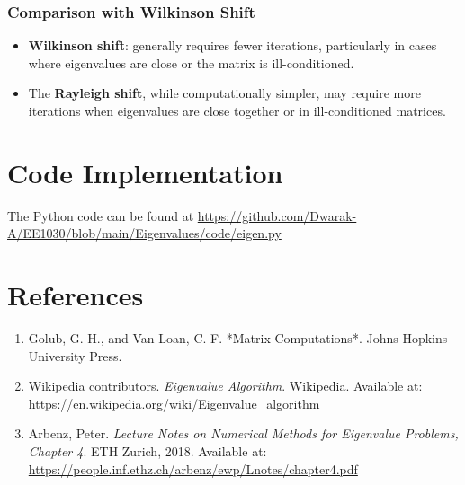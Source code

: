 \documentclass[12pt]{article}
\numberwithin{equation}{subsubsection}
\begin{document}
\subsubsection{Comparison with Wilkinson Shift}
\begin{itemize}
	\item \textbf{Wilkinson shift}: generally requires fewer iterations, particularly in cases where eigenvalues are close or the matrix is ill-conditioned.
	\item The \textbf{Rayleigh shift}, while computationally simpler, may require more iterations when eigenvalues are close together or in ill-conditioned matrices.
\end{itemize}

\section{Code Implementation}
The Python code can be found at
\url{https://github.com/Dwarak-A/EE1030/blob/main/Eigenvalues/code/eigen.py}

\appendix

\section{References}
\begin{enumerate}
	\item Golub, G. H., and Van Loan, C. F. *Matrix Computations*. Johns Hopkins University Press.
	\item Wikipedia contributors. \textit{Eigenvalue Algorithm}. Wikipedia. Available at: \url{https://en.wikipedia.org/wiki/Eigenvalue_algorithm}
	\item Arbenz, Peter. \textit{Lecture Notes on Numerical Methods for Eigenvalue Problems, Chapter 4}. ETH Zurich, 2018. Available at: \url{https://people.inf.ethz.ch/arbenz/ewp/Lnotes/chapter4.pdf}
	      
\end{enumerate}
\end{document}
